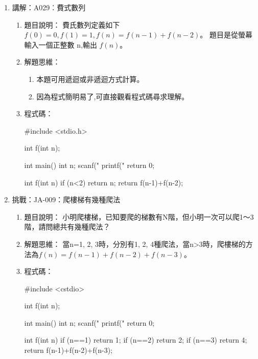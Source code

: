 \begin{enumerate}
\begin{enumerate}
\begin{cppcode}
			\end{cppcode}
		\end{enumerate}
	
	\item 講解：A029︰費式數列
		\begin{enumerate}
			\item 題目說明：
			\subitem 費氏數列定義如下 $f(0)=0, f(1)=1, f(n)=f(n-1)+f(n-2)$。
			題目是從螢幕輸入一個正整數 n,輸出 $f(n)$。
			
			\item 解題思維：
			\begin{enumerate}
				\item 本題可用遞迴或非遞迴方式計算。
				\item 因為程式簡明易了,可直接觀看程式碼尋求理解。
			\end{enumerate}
			
			\item 程式碼：
			\begin{cppcode}
				#include <stdio.h>

				int f(int n);

				int main()
				{
					int n;
					scanf("%
					printf("%
					return 0;
				}

				int f(int n)
				{
					if (n<2) return n;
					return f(n-1)+f(n-2);
				}
			\end{cppcode}
		\end{enumerate}
	
	\item 挑戰：JA-009：爬樓梯有幾種爬法
		\begin{enumerate}
			\item 題目說明：
			\subitem 小明爬樓梯，已知要爬的梯數有N階，但小明一次可以爬1～3階，請問總共有幾種爬法？
			
			\item 解題思維：
			\subitem
			當n=1, 2, 3時，分別有1, 2, 4種爬法，當n>3時，爬樓梯的方法為$f(n)=f(n-1)+f(n-2)+f(n-3)$。
			
			\item 程式碼：
			\begin{cppcode}
				#include <cstdio>
				
				int f(int n);
				
				int main()
				{
					int n;
					scanf("%
					printf("%
					return 0;
				}
				
				int f(int n)
				{
					if (n==1) return 1;
					if (n==2) return 2;
					if (n==3) return 4;
					return f(n-1)+f(n-2)+f(n-3);
				}
			\end{cppcode}
		\end{enumerate}
	

\end{enumerate}
